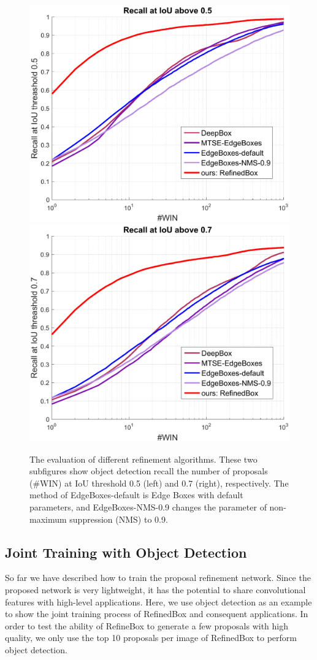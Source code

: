 \documentclass[10pt,twocolumn,letterpaper]{article}
\begin{document}
\begin{figure}[!ht]
  \centering
  \includegraphics[width=.425\linewidth]{refine-recall-proposals-0_5} 
  \hspace{.03\linewidth}
  \includegraphics[width=.425\linewidth]{refine-recall-proposals-0_7} \\
  \caption{The evaluation of different refinement algorithms. 
  	These two subfigures show object detection recall \vs the 
    number of proposals (\#WIN) at IoU threshold 0.5 (left) and
    0.7 (right), respectively. The method of EdgeBoxes-default 
    is Edge Boxes \cite{zitnick2014edge} with default parameters, 
    and EdgeBoxes-NMS-0.9 changes the parameter of non-maximum 
    suppression (NMS) to 0.9.}
  \label{fig:refine-evaluation}
  \vspace{-0.15in}
\end{figure}


\subsection{Joint Training with Object Detection} \label{sec: detection}
%
So far we have described how to train the proposal refinement network.
Since the proposed network is very lightweight,
it has the potential to share convolutional features 
with high-level applications.
Here, we use object detection as an example to show the joint 
training process of RefinedBox and consequent applications.
%
In order to test the ability of RefineBox to generate a few proposals
with high quality, we only use the top 10 proposals per image of RefinedBox 
to perform object detection.
\end{document}
